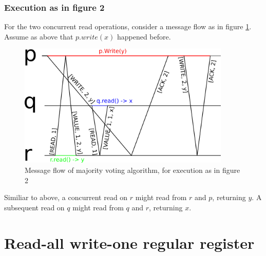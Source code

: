 \documentclass[a4paper]{scrreprt}
\begin{document}
\subsubsection{Execution as in figure 2}

For the two concurrent read operations, consider a message flow as in figure
\ref{fig:majority_voting_2}. Assume as above that $p.write(x)$ happened before.

\begin{figure}[h]
    \centering
    \includegraphics[width=0.9\textwidth]{res/5_1_b_2.png}
    \caption{Message flow of majority voting algorithm, for execution as in figure 2}
    \label{fig:majority_voting_2}
\end{figure}

Similiar to above, a concurrent read on $r$ might read from $r$ and $p$,
returning $y$. A subsequent read on $q$ might read from $q$ and $r$, returning
$x$.

\section{Read-all write-one regular register}
\end{document}
